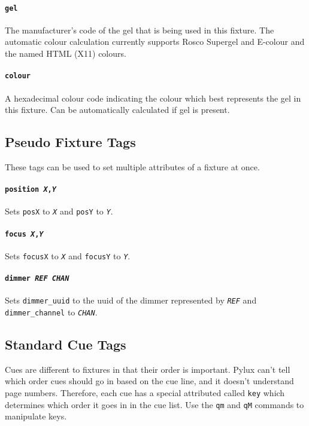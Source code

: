 \documentclass[a4paper]{article}
\begin{document}
\paragraph{\texttt{gel}}
The manufacturer's code of the gel that is being used in this fixture. The 
automatic colour calculation currently supports Rosco Supergel and E-colour 
and the named HTML (X11) colours.

\paragraph{\texttt{colour}}
A hexadecimal colour code indicating the colour which best represents the gel 
in this fixture. Can be automatically calculated if gel is present.

\subsection{Pseudo Fixture Tags}
These tags can be used to set multiple attributes of a fixture at once.

\paragraph{\texttt{position \textit{X},\textit{Y}}}
Sets \texttt{posX} to \texttt{\textit{X}} and \texttt{posY} to 
\texttt{\textit{Y}}.

\paragraph{\texttt{focus \textit{X},\textit{Y}}}
Sets \texttt{focusX} to \texttt{\textit{X}} and \texttt{focusY} to 
\texttt{\textit{Y}}.

\paragraph{\texttt{dimmer \textit{REF} \textit{CHAN}}}
Sets \texttt{dimmer\_uuid} to the uuid of the dimmer represented by 
\texttt{\textit{REF}} and \texttt{dimmer\_channel} to \texttt{\textit{CHAN}}.

\subsection{Standard Cue Tags}
Cues are different to fixtures in that their order is important. Pylux can't 
tell which order cues should go in based on the cue line, and it doesn't 
understand page numbers. Therefore, each cue has a special attributed called 
\texttt{key} which determines which order it goes in in the cue list. Use the 
\texttt{qm} and \texttt{qM} commands to manipulate keys.
\end{document}
